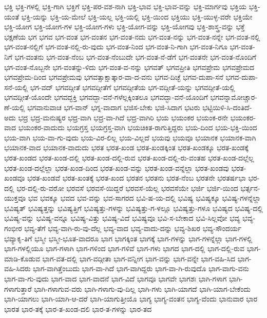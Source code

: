 {ಭಕ್ತಿ
ಭಕ್ತಿ-ಗಳಲ್ಲಿ
ಭಕ್ತಿ-ಗಾಗಿ
ಭಕ್ತಿಗೆ
ಭಕ್ತಿ-ಪರ-ವಶ-ನಾಗಿ
ಭಕ್ತಿ-ಭಾವ
ಭಕ್ತಿ-ಭಾವ-ವನ್ನು
ಭಕ್ತಿ-ಮಾರ್ಗವು
ಭಕ್ತಿಯ
ಭಕ್ತಿ-ಯಂತೆ
ಭಕ್ತಿ-ಯನ್ನು
ಭಕ್ತಿ-ಯ-ಮೇಲೆ
ಭಕ್ತಿ-ಯಲ್ಲ
ಭಕ್ತಿ-ಯಲ್ಲಿ
ಭಕ್ತಿ-ಯಿಂದ
ಭಕ್ತಿಯು
ಭಕ್ತಿ-ಯುಳ್ಳ-ವರೇ
ಭಕ್ತಿಯೇ
ಭಕ್ತಿ-ಯೋಗ
ಭಕ್ತಿ-ಯೋಗ-ಗಳ
ಭಕ್ತಿ-ಯೋಗ-ಗಳು
ಭಕ್ತಿ-ಯೋಗ-ವನ್ನು
ಭಕ್ತಿ-ಯೋಗವು
ಭಕ್ತಿ-ಶಾಸ್ತ್ರ-ವನ್ನು
ಭಕ್ತೆ
ಭಕ್ಷಣೆಯ
ಭಗ
ಭಗವ
ಭಗ-ವಂತ
ಭಗ-ವಂತನ
ಭಗ-ವಂತ-ನದು
ಭಗ-ವಂತ-ನನ್ನು
ಭಗ-ವಂತ-ನನ್ನೇ
ಭಗ-ವಂತ-ನಲ್ಲಿ
ಭಗ-ವಂತ-ನಲ್ಲಿಗೆ
ಭಗ-ವಂತ-ನಲ್ಲಿ-ರು-ವುದು
ಭಗ-ವಂತ-ನಿಂದ
ಭಗ-ವಂತ-ನಿ-ಗಾಗಿ
ಭಗ-ವಂತ-ನಿಗೂ
ಭಗ-ವಂತ-ನಿಗೆ
ಭಗ-ವಂತನು
ಭಗ-ವಂತ-ನೆಂಬ
ಭಗ-ವಂತ-ನೆಂಬುದೇ
ಭಗ-ವಂತ-ನೆ-ಡೆಗೆ
ಭಗ-ವಂತನೇ
ಭಗ-ವಂತ-ನೊಂದಿಗೆ
ಭಗ-ವಂತ-ನೊಬ್ಬನೇ
ಭಗ-ವಂತನ್ನು-ಳಿದು
ಭಗ-ವಂತ-ವ-ನನ್ನು
ಭಗವತ್
ಭಗವಪ್ರೀತಿ
ಭಗವಪ್ರೇಮ
ಭಗವಪ್ರೇಮದ
ಭಗವಪ್ರೇಮ-ದಿಂದ
ಭಗವಪ್ರೇಮವು
ಭಗವತ್ಸಾಕ್ಷಾತ್ಕಾರ-ವಾ-ದ-ವನು
ಭಗವ-ದಿಚ್ಛೆ
ಭಗವ-ದುಪಾ-ಸನೆ
ಭಗವ-ದುಪಾ-ಸನೆ-ಯಲ್ಲಿ
ಭಗ-ವದ್
ಭಗವದ್ಗೀತೆ
ಭಗವದ್ಗೀತೆಗೆ
ಭಗವದ್ಗೀತೆಯ
ಭಗ-ವದ್ಗೀತೆ-ಯನ್ನು
ಭಗವದ್ಗೀತೆ-ಯಲ್ಲಿ
ಭಗವದ್ಗೀತೆ-ಯೊಂದೇ
ಭಗವದ್ಭಕ್ತಿ
ಭಗವದ್ಭಾ-ವನೆ-ಗಳೆಲ್ಲಕ್ಕಿಂತಲೂ
ಭಗವದ್ಭಾ-ವನೆ-ಯೊಂದಿಗೆ
ಭಗವನ್ನಾಮೋಚ್ಚಾರ-ಣೆ-ಯಲ್ಲಿ
ಭಗವಾನುವಾಚ
ಭಗ-ವಾನ್
ಭಗ್ನ-ವಾದಾಗ
ಭಜಿಸ-ಬೇಕು
ಭಜಿ-ಸಿದಾಗ
ಭಟರು
ಭಟ್ಟಿಯಿಳಿ-ಸಿ-ದಂತಿದೆ-ಅದು
ಭದ್ರ
ಭದ್ರ-ಮನುಷ್ಯರ
ಭದ್ರ-ವಾಗಿ
ಭದ್ರ-ವಾ-ಗಿದೆ
ಭದ್ರ-ವಾಗಿರಿ
ಭಯ
ಭಯಂಕರ
ಭಯಂಕ-ರನೇ
ಭಯಂಕರ-ವಾದ
ಭಯಂಕರ-ವಾದುದು
ಭಯಗ್ರಸ್ತ
ಭಯಗ್ರಸ್ತ-ವಾಗಿ
ಭಯಚಿಕಿತ-ರಾಗುತ್ತಿದ್ದರು
ಭಯ-ದಿಂದ
ಭಯ-ಭಕ್ತಿ-ಯಿಂದ
ಭಯ-ವಾಗಿ
ಭಯ-ವಾ-ಗು-ವುದು
ಭಯ-ವಿರ-ಲಿಲ್ಲ
ಭಯ-ವಿಲ್ಲದೆ
ಭಯವು
ಭಯವೂ
ಭಯಾನಕ
ಭಯಾನಕ-ವಾಗಿ
ಭಯಾನಕ-ವಾದ
ಭಯಾನಕ-ವಾದುದು
ಭರತ
ಭರತ-ಖಂಡ
ಭರತ-ಖಂಡಕ್ಕಿಂತ
ಭರತ-ಖಂಡಕ್ಕೂ
ಭರತ-ಖಂಡಕ್ಕೆ
ಭರತ-ಖಂಡದ
ಭರತ-ಖಂಡ-ದಲ್ಲಿ
ಭರತ-ಖಂಡ-ದಲ್ಲಿ-ರುವ
ಭರತ-ಖಂಡ-ದಲ್ಲಿ-ರು-ವಂತಹ
ಭರತ-ಖಂಡ-ದಲ್ಲೆಲ್ಲ
ಭರತ-ಖಂಡ-ದಲ್ಲೆಲ್ಲಾ
ಭರತ-ಖಂಡ-ದಿಂದ
ಭರತ-ಖಂಡ-ವನ್ನು
ಭರತ-ಖಂಡ-ವನ್ನೆಲ್ಲಾ
ಭರತ-ಖಂಡವು
ಭರತ-ಖಂಡವೂ
ಭರತ-ಖಂಡವೆ
ಭರತ-ಖಂತಕ್ಕೆ
ಭರತ-ಖಂದ
ಭರತನ
ಭರತನು
ಭರತ-ನೆಂಬ
ಭರತನೇ
ಭರತರ್ಷಭಾ
ಭರ-ದಲ್ಲಿ
ಭರ-ದಲ್ಲಿ-ರು-ವರೋ
ಭರವಸೆ
ಭರವಸೆ-ಯಿದ್ದರೆ
ಭರವಸೆ-ಯೆಲ್ಲ
ಭರವಸೆಯೇ
ಭರ್ಜಿ
ಭರ್ಜಿ-ಯಿಂದ
ಭರ್ತ್ಸನ-ಯುಕ್ತವೂ
ಭವ
ಭವಕ್ಕೂ
ಭವದ
ಭವ-ವನ್ನು
ಭವ-ಸಾಗರದ
ಭವಿ-ಷ-ಯ-ದಲ್ಲಿ
ಭವಿಷ್ಯ
ಭವಿಷ್ಯಕ್ಕೂ
ಭವಿಷ್ಯ-ಗಳನ್ನೆಲ್ಲಾ
ಭವಿಷ್ಯತ್
ಭವಿಷ್ಯತ್ತನ್ನು
ಭವಿಷ್ಯತ್ತಿಗೆ
ಭವಿಷ್ಯತ್ತು-ಗಳನ್ನು
ಭವಿಷ್ಯತ್ತು-ಗ-ಳಲ್ಲೂ
ಭವಿಷ್ಯತ್ತು-ಗಳೂ
ಭವಿಷ್ಯದ
ಭವಿಷ್ಯ-ದಲ್ಲಿ
ಭವಿಷ್ಯ-ವನ್ನು
ಭವಿಷ್ಯ-ವನ್ನೂ
ಭವಿಷ್ಯ-ವಿತ್ತು
ಭವಿಷ್ಯ-ವಿದೆ
ಭವಿಷ್ಯವೂ
ಭವಿ-ಸ-ಬೇಕಾದ
ಭವಿ-ಸಿಲ್ಲವೋ
ಭವ್ಯ
ಭವ್ಯ-ಗಂಭೀರ
ಭವ್ಯ-ತೆಗೆ
ಭವ್ಯ-ವಾಗಿ-ರು-ವು-ದೆಲ್ಲ
ಭವ್ಯ-ವಾದ
ಭವ್ಯ-ವಾದು-ದನ್ನು
ಭವ್ಯ-ಶಿಖರ
ಭವ್ಯ-ಸೌಂದರ್ಯ
ಭವ್ಯಾಕೃ-ತಿಗೆ
ಭಸ್ಮೀ
ಭಸ್ಮೀ-ಭೂತ-ವಾದರೂ
ಭಾಗ
ಭಾಗಕ್ಕಿಂತ
ಭಾಗಕ್ಕೆ
ಭಾಗ-ಗಳನ್ನು
ಭಾಗ-ಗಳನ್ನೆಲ್ಲಾ
ಭಾಗ-ಗಳಲ್ಲಿ
ಭಾಗ-ಗಳಲ್ಲಿಯೂ
ಭಾಗ-ಗಳಾಗಿ
ಭಾಗ-ಗಳಿಂದ
ಭಾಗ-ಗಳಿವೆ
ಭಾಗ-ಗಳು
ಭಾಗದ
ಭಾಗ-ದಲ್ಲಿ
ಭಾಗ-ದಲ್ಲಿ-ರುವ
ಭಾಗ-ಮಾಡಿ-ಕೊಡುವ
ಭಾಗ-ವತ-ದಲ್ಲಿ
ಭಾಗ-ವದ್ಗೀತಾ
ಭಾಗ-ವನ್ನೀಗ
ಭಾಗ-ವನ್ನು
ಭಾಗ-ವನ್ನೇ
ಭಾಗ-ವಹಿ-ಸಿದ
ಭಾಗ-ವಹಿ-ಸಿದರು
ಭಾಗ-ವಾಗಿತ್ತೆಂಬುದು
ಭಾಗ-ವಾ-ಗಿದೆ
ಭಾಗ-ವಾಗಿದ್ದರು
ಭಾಗ-ವಾ-ಗಿ-ರುವುದೊ
ಭಾಗ-ವಾಗು-ವನು
ಭಾಗ-ವಾ-ಗು-ವುದು
ಭಾಗ-ವಾದ
ಭಾಗ-ವಾದನೆ
ಭಾಗ-ವಿದೆ
ಭಾಗವೂ
ಭಾಗವೇ
ಭಾಗಶಃ
ಭಾಗಿ-ಗಳಾಗ
ಭಾಗಿ-ಗಳಾಗುತ್ತಾರೆ
ಭಾಗಿ-ಗಳಾಗುವ-ವರು
ಭಾಗಿ-ಗಳಾಗು-ವು-ದಿಲ್ಲ
ಭಾಗಿ-ಗಳು
ಭಾಗಿ-ಯಾಗದೆ
ಭಾಗಿ-ಯಾಗ-ಬೇಕೆಂದು
ಭಾಗಿ-ಯಾಗಲು
ಭಾಗಿ-ಯಾಗಿ-ಆ-ದರೆ
ಭಾಗಿ-ಯಾಗುತ್ತೀಯೊ
ಭಾಗ್ಯ
ಭಾಗ್ಯ-ವಂತನ
ಭಾಗ್ಯ-ವೆಂದು
ಭಾನುವಾರ
ಭಾರ
ಭಾರತ
ಭಾರ-ತಕ್ಕೆ
ಭಾರ-ತ-ಖಂಡ-ದಲಿ
ಭಾರ-ತ-ಗಳನ್ನು
ಭಾರ-ತದ
}
